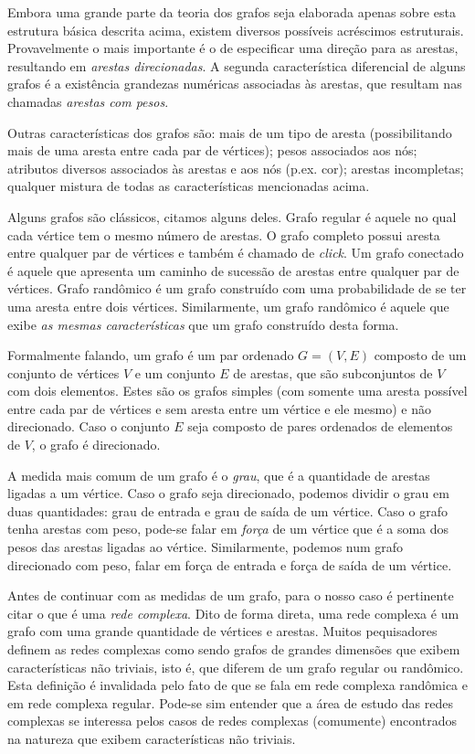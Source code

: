 \documentclass[12pt]{article}
\begin{document}
Embora uma grande parte da teoria dos grafos seja elaborada apenas sobre esta estrutura básica descrita acima, existem diversos possíveis acréscimos estruturais. Provavelmente o mais importante é o de especificar uma direção para as arestas, resultando em \emph{arestas direcionadas}. A segunda característica diferencial de alguns grafos é a existência grandezas numéricas associadas às arestas, que resultam nas chamadas \emph{arestas com pesos}.

Outras características dos grafos são: mais de um tipo de aresta (possibilitando mais de uma aresta entre cada par de vértices); pesos associados aos nós; atributos diversos associados às arestas e aos nós (p.ex. cor); arestas incompletas; qualquer mistura de todas as características mencionadas acima.

Alguns grafos são clássicos, citamos alguns deles. Grafo regular é aquele no qual cada vértice tem o mesmo número de arestas. O grafo completo possui aresta entre qualquer par de vértices e também é chamado de \emph{click}. Um grafo conectado é aquele que apresenta um caminho de sucessão de arestas entre qualquer par de vértices. Grafo randômico é um grafo construído com uma probabilidade de se ter uma aresta entre dois vértices. Similarmente, um grafo randômico é aquele que exibe \emph{as mesmas características} que um grafo construído desta forma.

Formalmente falando, um grafo é um par ordenado $G=(V,E)$ composto de um conjunto de vértices $V$ e um conjunto $E$ de arestas, que são subconjuntos de $V$ com dois elementos. Estes são os grafos simples (com somente uma aresta possível entre cada par de vértices e sem aresta entre um vértice e ele mesmo) e não direcionado. Caso o conjunto $E$ seja composto de pares ordenados de elementos de $V$, o grafo é direcionado.

A medida mais comum de um grafo é o \emph{grau}, que é a quantidade de arestas ligadas a um vértice. Caso o grafo seja direcionado, podemos dividir o grau em duas quantidades: grau de entrada e grau de saída de um vértice. Caso o grafo tenha arestas com peso, pode-se falar em \emph{força} de um vértice que é a soma dos pesos das arestas ligadas ao vértice. Similarmente, podemos num grafo direcionado com peso, falar em força de entrada e força de saída de um vértice.

Antes de continuar com as medidas de um grafo, para o nosso caso é pertinente citar o que é uma \emph{rede complexa}. Dito de forma direta, uma rede complexa é um grafo com uma grande quantidade de vértices e arestas. Muitos pequisadores definem as redes complexas como sendo grafos de grandes dimensões que exibem características não triviais, isto é, que diferem de um grafo regular ou randômico. Esta definição é invalidada pelo fato de que se fala em rede complexa randômica e em rede complexa regular. Pode-se sim entender que a área de estudo das redes complexas se interessa pelos casos de redes complexas (comumente) encontrados na natureza que exibem características não triviais. 
\end{document}
